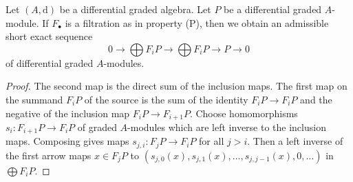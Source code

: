 \begin{lemma}
\label{lemma-property-P-sequence}
Let $(A, \text{d})$ be a differential graded algebra.
Let $P$ be a differential graded $A$-module. If $F_\bullet$
is a filtration as in property (P), then we obtain an
admissible short exact sequence
$$
0 \to
\bigoplus\nolimits F_iP \to
\bigoplus\nolimits F_iP \to P \to 0
$$
of differential graded $A$-modules.
\end{lemma}

\begin{proof}
The second map is the direct sum of the inclusion maps.
The first map on the summand $F_iP$ of the source is the sum
of the identity $F_iP \to F_iP$ and the negative of the inclusion
map $F_iP \to F_{i + 1}P$. Choose homomorphisms $s_i : F_{i + 1}P \to F_iP$
of graded $A$-modules which are left inverse to the inclusion maps.
Composing gives maps $s_{j, i} : F_jP \to F_iP$ for all $j > i$.
Then a left inverse of the first arrow maps $x \in F_jP$ to
$(s_{j, 0}(x), s_{j, 1}(x), \ldots, s_{j, j - 1}(x), 0, \ldots)$
in $\bigoplus F_iP$.
\end{proof}
